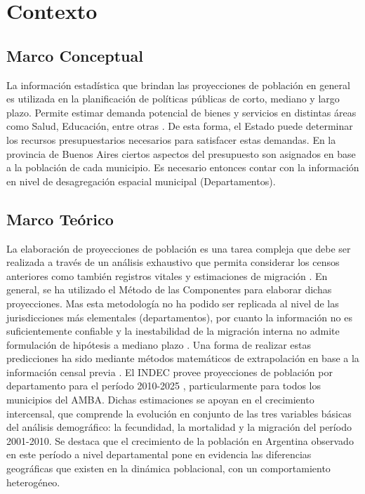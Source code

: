 \documentclass{article}
\theoremstyle{mytheoremstyle}
\theoremstyle{mytheoremstyle}
\theoremstyle{myproblemstyle}
\begin{document}
\section{Contexto}
\subsection{Marco Conceptual}
  La información estadística que brindan las proyecciones de población en general es utilizada en  la planificación
   de políticas públicas de corto, mediano y largo plazo.
   Permite estimar demanda potencial de bienes y servicios en distintas áreas como Salud, Educación, entre otras .\newline\newline
   De esta forma, el Estado puede determinar los recursos presupuestarios necesarios para satisfacer estas demandas. 
   En la provincia de Buenos Aires ciertos aspectos del presupuesto son asignados en base a la población de cada municipio. 
   Es necesario entonces contar con la información en nivel de desagregación espacial municipal (Departamentos).
  \subsection{Marco Teórico}
  La elaboración de proyecciones de población es una tarea compleja que debe ser realizada a través de un
   análisis exhaustivo que permita considerar los censos anteriores como también registros vitales y
  estimaciones de migración .\newline\newline
  En general, se ha utilizado el Método de las Componentes para elaborar dichas proyecciones.
   Mas esta metodología no ha podido ser replicada al nivel de las 
   jurisdicciones más elementales (departamentos), por cuanto la información no es suficientemente confiable
    y la inestabilidad de la migración interna no admite formulación de hipótesis a mediano plazo .
    Una forma de realizar estas predicciones ha sido mediante métodos matemáticos de extrapolación en base
   a la información censal previa .\newline\newline
  El INDEC provee proyecciones de población por departamento para el período 2010-2025 , 
  particularmente para todos los municipios del AMBA. Dichas estimaciones se apoyan en el crecimiento intercensal, que comprende la evolución en conjunto
  de las tres variables básicas del análisis demográfico: la fecundidad, la mortalidad y la migración del período
  2001-2010. Se destaca que el crecimiento de la población en Argentina observado en este período a nivel departamental 
  pone en evidencia las diferencias geográficas que existen en la dinámica poblacional, con un comportamiento heterogéneo.
  
\end{document}
